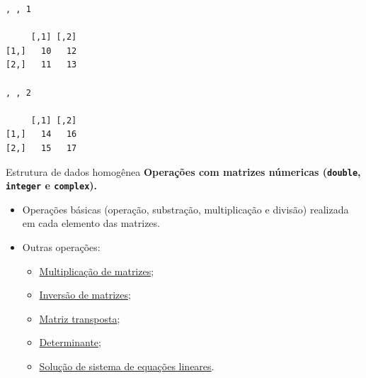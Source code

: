 \documentclass[
  10pt,
  ignorenonframetext,
]{beamer}
\providecommand{\tightlist}{%
  \setlength{\itemsep}{0pt}\setlength{\parskip}{0pt}}\usepackage{longtable,booktabs,array}
\begin{document}
\begin{frame}[fragile]
\begin{verbatim}
, , 1

     [,1] [,2]
[1,]   10   12
[2,]   11   13

, , 2

     [,1] [,2]
[1,]   14   16
[2,]   15   17
\end{verbatim}
\end{frame}

\begin{frame}[fragile]{Estrutura de dados homogênea}
\protect\hypertarget{estrutura-de-dados-homoguxeanea-9}{}
\textbf{Operações com matrizes númericas (\texttt{double},
\texttt{integer} e \texttt{complex}).}

\begin{itemize}
\tightlist
\item
  Operações básicas (operação, substração, multiplicação e divisão)
  realizada em cada elemento das matrizes.
\item
  Outras operações:

  \begin{itemize}
  \tightlist
  \item
    \href{https://pt.wikipedia.org/wiki/Produto_de_matrizes}{Multiplicação
    de matrizes};
  \item
    \href{https://pt.wikipedia.org/wiki/Matriz_inversa}{Inversão de
    matrizes};
  \item
    \href{https://pt.wikipedia.org/wiki/Matriz_transposta}{Matriz
    transposta};
  \item
    \href{https://pt.wikipedia.org/wiki/Determinante}{Determinante};
  \item
    \href{https://pt.wikipedia.org/wiki/Sistema_de_equações_lineares}{Solução
    de sistema de equações lineares}.
  \end{itemize}
\end{itemize}
\end{frame}
\end{document}
